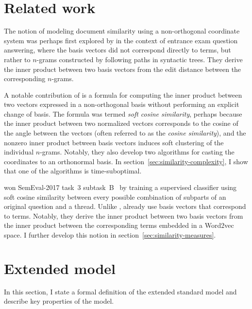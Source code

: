 \documentclass[
  digital, %
  notable, %
  lof,     %
  lot,     %
  nopalatino, color
]{fithesis3}
\let\term\emph
\let\emph=\textit
\begin{document}
\section{Related work}
\label{sec:similarity-relwork}
The notion of modeling document similarity using a non-orthogonal coordinate
system was perhaps first explored by \textcite{sidorov2014soft} in the context
of entrance exam question answering, where the basis vectors did not correspond
directly to terms, but rather to $n$-grams constructed by
following paths in syntactic trees. They derive the inner product between two
basis vectors from the edit distance between the
corresponding $n$-grams.

A notable contribution of \textcite{sidorov2014soft} is a formula for computing
the inner product between two vectors expressed in a non-orthogonal basis
without performing an explicit change of basis. The formula was termed \term{soft
cosine similarity}, perhaps because the
inner product between two normalized vectors corresponds to the cosine of the
angle between the vectors (often referred to as the \term{cosine
similarity}), and the nonzero inner product
between basis vectors induces soft clustering of the individual $n$-grams.
Notably, they also develop two algorithms for casting the coordinates to an
orthonormal basis. In section~\ref{sec:similarity-complexity}, I show that one
of the algorithms is time-suboptimal.

\textcite{charletdamnati17} won SemEval-2017 task~3
subtask~B~\cite{nakov2017semeval} by training a supervised classifier using
soft cosine similarity between every possible combination of subparts of an
original question and a thread. Unlike \textcite{sidorov2014soft},
\textcite{charletdamnati17} already use basis vectors that correspond to terms.
Notably, they derive the inner product between two basis vectors from the inner
product between the corresponding terms embedded in a
Word2vec~\cite{mikolov2013efficient}
space. I further develop this notion in section~\ref{sec:similarity-measures}.

\section{Extended model}
\label{sec:similarity-model}
In this section, I state a formal definition of the extended standard
model and describe key properties of the model.
\end{document}
